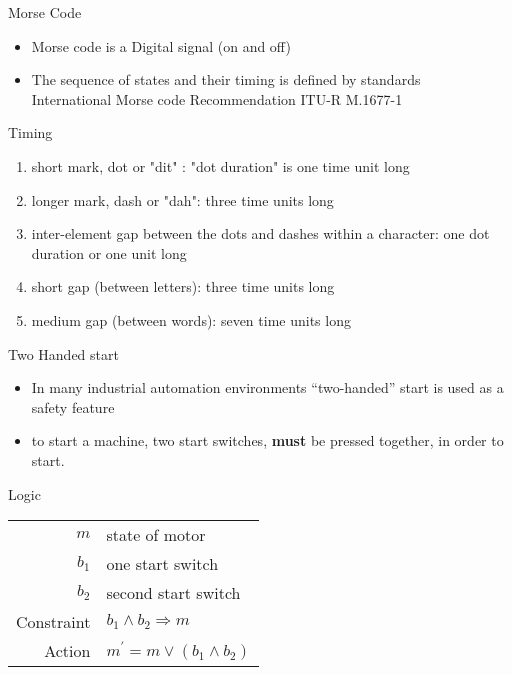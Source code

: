 \documentclass[xcolor=svgnames]{beamer}
\begin{document}
\begin{frame}{Morse Code}
  \begin{itemize}
    \item Morse code is a Digital signal (on and off)
    \item The sequence of states and their timing is defined by standards\\
     International Morse code Recommendation ITU-R M.1677-1
  \end{itemize}

\begin{exampleblock}{Timing}
\begin{enumerate}
  \item short mark, dot or "dit" : "dot duration" is one time unit long
  \item longer mark, dash or "dah": three time units long
  \item inter-element gap between the dots and dashes within a character: one dot duration or one unit long
  \item short gap (between letters): three time units long
  \item medium gap (between words): seven time units long
\end{enumerate}
\end{exampleblock}
\end{frame}

\begin{frame}{Two Handed start}
\begin{itemize}
  \item In many industrial automation environments ``two-handed'' start is used as a safety feature
  \item to start a machine, two start switches, \textbf{must} be pressed together, in order to start.
\end{itemize}
\begin{exampleblock}{Logic}
  \begin{tabular}{rl}
      $m$ & state of motor \\
      $b_1$ & one start switch \\
      $b_2$ & second start switch \\ \midrule
      Constraint & $ b_1 \wedge b_2 \Rightarrow m $ \\ \midrule
      Action & $ m^\prime = m\vee (b_1\wedge b_2) $ \\
  \end{tabular}



\end{exampleblock}
\end{frame}
\end{document}
